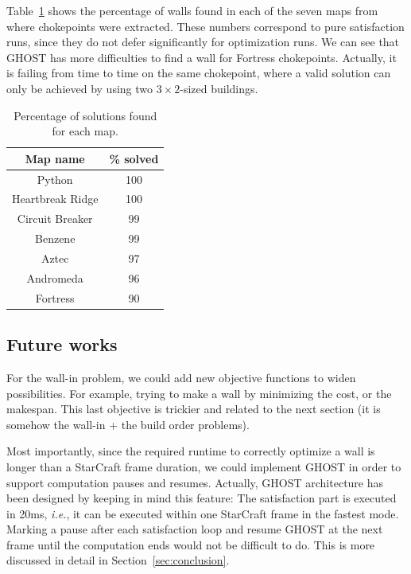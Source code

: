 \documentclass{article}
\newcommand{\ghost}{\textsc{GHOST}\xspace}
\newcommand{\ie}{\textit{i.e.}}
\begin{document}
Table~\ref{tab:map} shows the percentage of walls found in each of the
seven  maps  from where  chokepoints  were  extracted.  These  numbers
correspond  to  pure  satisfaction  runs,  since  they  do  not  defer
significantly for optimization  runs. We can see that  \ghost has more
difficulties to find a wall  for Fortress chokepoints. Actually, it is
failing  from time  to  time on  the same  chokepoint,  where a  valid
solution  can  only  be  achieved  by using  two  $3  \times  2$-sized
buildings.
\begin{table}[ht]
  \caption{Percentage of solutions found for each map.} 
    \label{tab:map}
    \centering
    \begin{tabular}{|c|c|}
      \hline
      Map name & \% solved\\
      \hline
      Python & 100\\
      Heartbreak Ridge & 100\\
      Circuit Breaker & 99\\
      Benzene & 99\\
      Aztec & 97\\
      Andromeda & 96\\
      Fortress & 90\\
      \hline
    \end{tabular}  
\end{table}
\subsection{Future works}

For the wall-in problem, we could add new objective functions to widen
possibilities. For  example, trying to  make a wall by  minimizing the
cost, or the makespan.  This last objective is trickier and related to
the  next  section (it  is  somehow  the  wall-in  + the  build  order
problems).

Most importantly, since  the required runtime to  correctly optimize a
wall is  longer than  a StarCraft frame  duration, we  could implement
\ghost in order  to support computation pauses  and resumes. Actually,
\ghost architecture has been designed by keeping in mind this feature:
The satisfaction  part is executed  in 20ms,  \ie, it can  be executed
within one StarCraft frame in the fastest mode.  Marking a pause after
each satisfaction loop  and resume \ghost at the next  frame until the
computation ends would not be difficult  to do. This is more discussed
in detail in Section~\ref{sec:conclusion}.
\end{document}
